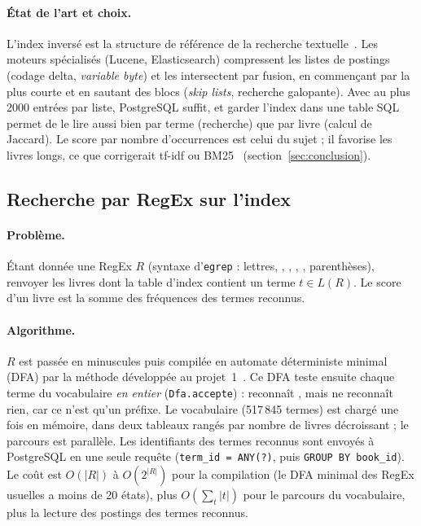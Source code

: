 \paragraph{État de l'art et choix.} L'index inversé est la structure de
référence de la recherche textuelle~\cite{zobel,iir}. Les moteurs spécialisés
(Lucene, Elasticsearch) compressent les listes de postings (codage delta,
\emph{variable byte}) et les intersectent par fusion, en commençant par la plus
courte et en sautant des blocs (\emph{skip lists}, recherche galopante). Avec
au plus 2000 entrées par liste, PostgreSQL suffit, et garder l'index dans une
table SQL permet de le lire aussi bien par terme (recherche) que par livre
(calcul de Jaccard). Le score par nombre d'occurrences est celui du sujet ; il
favorise les livres longs, ce que corrigerait tf-idf ou BM25~\cite{bm25}
(section~\ref{sec:conclusion}).

\subsection{Recherche par RegEx sur l'index}
\label{sec:regexindex}

\paragraph{Problème.} Étant donnée une RegEx $R$ (syntaxe d'\texttt{egrep} :
lettres, , \motif{|}, \motif{*}, \motif{+}, parenthèses), renvoyer les
livres dont la table d'index contient un terme $t \in L(R)$. Le score d'un livre
est la somme des fréquences des termes reconnus.

\paragraph{Algorithme.} $R$ est passée en minuscules puis compilée en automate
déterministe minimal (DFA) par la méthode développée au projet~1~\cite{projet1}.
Ce DFA teste ensuite chaque terme du
vocabulaire \emph{en entier} (\texttt{Dfa.accepte}) :  reconnaît
, mais  ne reconnaît rien, car ce n'est qu'un préfixe.
Le vocabulaire (517\,845 termes) est chargé une fois en mémoire, dans deux
tableaux rangés par nombre de livres décroissant ; le parcours est parallèle.
Les identifiants des termes reconnus sont envoyés à PostgreSQL en une seule
requête (\texttt{term\_id = ANY(?)}, puis \texttt{GROUP BY book\_id}). Le coût
est $O(|R|)$ à $O(2^{|R|})$ pour la compilation (le DFA minimal des RegEx
usuelles a moins de 20 états), plus $O(\sum_t |t|)$ pour le parcours du
vocabulaire, plus la lecture des postings des termes reconnus.


